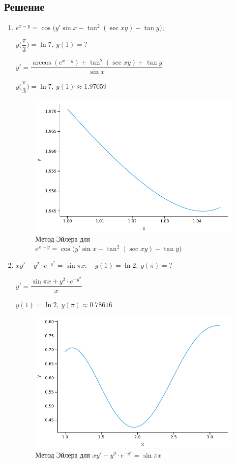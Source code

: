\documentclass[a4paper, 14pt, fleqn]{extarticle}
\begin{document}
		\subsection{Решение}
				\begin{enumerate}
					\item \( e^{x-y} = \cos{\big(y'\sin{x} - \tan^2{(\sec{xy})} - \tan{y}\big)}; \)

						\( y\bigg(\dfrac{\pi}{3}\bigg) = \ln{7},\ y(1) = ? \)
						
						\( y' = \dfrac{\arccos{(e^{x-y})} +  \tan^2{(\sec{xy})} + \tan{y}}{\sin{x}} \)

						\( y\bigg(\dfrac{\pi}{3}\bigg) = \ln{7},\ y(1) \approx 1.97059 \)

						\begin{figure}[H]
						    	\centering
						    	\includegraphics[width = .7\linewidth]{plot2.pdf}
						   	\caption[.] {Метод Эйлера для \linebreak \( e^{x-y} = \cos{\big(y'\sin{x} - \tan^2{(\sec{xy})} - \tan{y}\big)}\)}
  						\end{figure}
					\item  \( xy' - y^2 \cdot e^{-y^2} = \sin{\pi x}; \quad y(1) = \ln{2},\  y{(\pi)} = ?\)

						\( y' = \dfrac{\sin{\pi x} + y^2 \cdot e^{-y^2}}{x} \)

						\(  y(1) = \ln{2},\  y{(\pi)} \approx 0.78616 \)

						\begin{figure}[H]
						    	\centering
						    	\includegraphics[width = .7\linewidth]{plot1.pdf}
						   	\caption[.] {Метод Эйлера для \linebreak \( xy' - y^2 \cdot e^{-y^2} = \sin{\pi x} \)}
  						\end{figure}	
				\end{enumerate}
\end{document}
